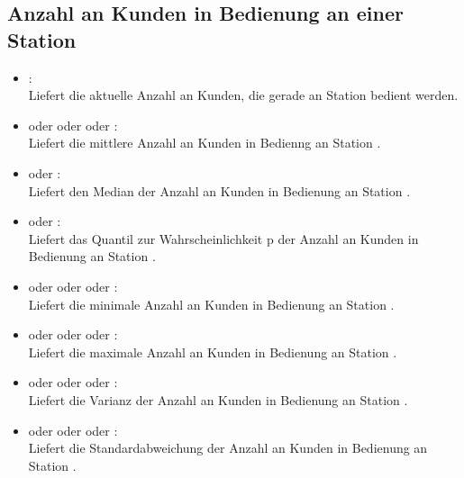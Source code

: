 


\subsection{Anzahl an Kunden in Bedienung an einer Station}

\begin{itemize}

\item
{}:\\
Liefert die aktuelle Anzahl an Kunden, die gerade an Station  bedient werden.

\item
{} oder  oder  oder :\\
Liefert die mittlere Anzahl an Kunden in Bedienng an Station .

\item
{} oder :\\
Liefert den Median der Anzahl an Kunden in Bedienung an Station .

\item
{} oder :\\
Liefert das Quantil zur Wahrscheinlichkeit p der Anzahl an Kunden in Bedienung an Station .

\item
{} oder  oder  oder :\\
Liefert die minimale Anzahl an Kunden in Bedienung an Station .

\item
{} oder  oder  oder :\\
Liefert die maximale Anzahl an Kunden in Bedienung an Station .

\item
{} oder  oder  oder  :\\
Liefert die Varianz der Anzahl an Kunden in Bedienung an Station .

\item
{} oder  oder  oder :\\
Liefert die Standardabweichung der Anzahl an Kunden in Bedienung an Station .


\end{itemize}
